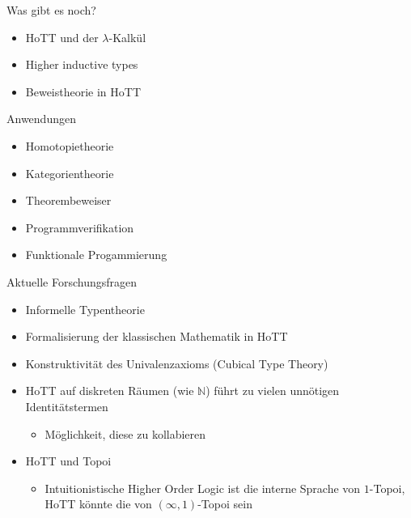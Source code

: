 \documentclass[11pt,aspectratio=169,notheorems]{beamer}
\begin{document}
\begin{frame}{Was gibt es noch?}
    \begin{itemize}
        \item HoTT und der $\lambda$-Kalkül
        \item Higher inductive types
        \item Beweistheorie in HoTT
    \end{itemize}
\end{frame}


\begin{frame}{Anwendungen}
    \begin{itemize}
        \item Homotopietheorie
        \item Kategorientheorie
        \item Theorembeweiser
        \item Programmverifikation
        \item Funktionale Progammierung
    \end{itemize}
\end{frame}

\begin{frame}{Aktuelle Forschungsfragen}
    \begin{itemize}
        \item Informelle Typentheorie
        \item Formalisierung der klassischen Mathematik in HoTT
        \item Konstruktivität des Univalenzaxioms (Cubical Type Theory)
        \item HoTT auf diskreten Räumen (wie $\mathbb{N}$) führt zu vielen \glqq{}unnötigen\grqq{} Identitätstermen
        \begin{itemize}
            \item Möglichkeit, diese zu kollabieren
        \end{itemize} 
        \item HoTT und Topoi
        \begin{itemize}
            \item Intuitionistische Higher Order Logic ist die interne Sprache von $1$-Topoi, HoTT könnte die von $(\infty, 1)$-Topoi sein
        \end{itemize}
    \end{itemize}
\end{frame}

\begin{frame}[noframenumbering]{}
    \thispagestyle{empty}
    \begin{center}
        \scalebox{10}{\ucmark}
    \end{center}
\end{frame}
\end{document}
